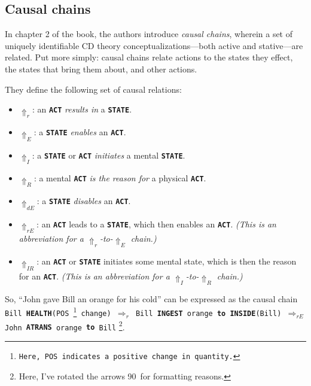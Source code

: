 \subsection{Causal chains}
In chapter 2 of the book, the authors introduce \textit{causal chains}, wherein a set of uniquely identifiable CD theory conceptualizations---both active and stative---are related. Put more simply: causal chains relate actions to the states they effect, the states that bring them about, and other actions.

They define the following set of causal relations:

\begin{itemize}
    \item $\Uparrow_{r}$: an \texttt{\textbf{ACT}} \textit{results in} a \texttt{\textbf{STATE}}.
    
    \item $\Uparrow_{E}$: a \texttt{\textbf{STATE}} \textit{enables} an \texttt{\textbf{ACT}}.
    
    \item $\Uparrow_{I}$: a \texttt{\textbf{STATE}} or \texttt{\textbf{ACT}} \textit{initiates} a mental \texttt{\textbf{STATE}}.
    
    \item $\Uparrow_{R}$: a mental \texttt{\textbf{ACT}} \textit{is the reason for} a physical \texttt{\textbf{ACT}}.
    
    \item $\Uparrow_{dE}$: a \texttt{\textbf{STATE}} \textit{disables} an \texttt{\textbf{ACT}}.
    
    \item $\Uparrow_{rE}$: an \texttt{\textbf{ACT}} leads to a \texttt{\textbf{STATE}}, which then enables an \texttt{\textbf{ACT}}. \textit{(This is an abbreviation for a $\Uparrow_{r}$-to-$\Uparrow_{E}$ chain.)}
    
    \item $\Uparrow_{IR}$: an \texttt{\textbf{ACT}} or \texttt{\textbf{STATE}} initiates some mental state, which is then the reason for an \texttt{\textbf{ACT}}. \textit{(This is an abbreviation for a $\Uparrow_{I}$-to-$\Uparrow_{R}$ chain.)}
\end{itemize}

So, ``John gave Bill an orange for his cold'' can be expressed as the causal chain \texttt{Bill \textbf{HEALTH}(POS \footnote{Here, \texttt{POS} indicates a positive change in quantity.} change) $\Rightarrow_{r}$ Bill \textbf{INGEST} orange \textbf{to INSIDE}(Bill) $\Rightarrow_{rE}$ John \textbf{ATRANS} orange \textbf{to} Bill} \footnote{Here, I've rotated the arrows 90\degree\ for formatting reasons.}.

